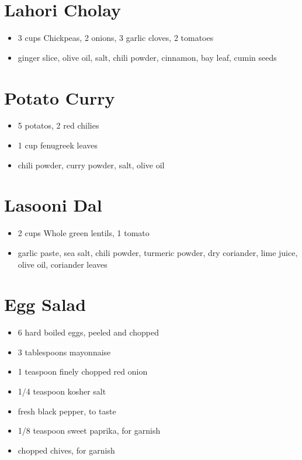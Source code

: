 \documentclass[10pt]{extarticle}
\begin{document}
		\section{Lahori Cholay}
		\begin{itemize}
			\item 3 cups Chickpeas, 2 onions, 3 garlic cloves, 2 tomatoes
			\item ginger slice, olive oil, salt, chili powder, cinnamon, bay leaf, cumin seeds
		\end{itemize}
		\section{Potato Curry}
		\begin{itemize}
			\item 5 potatos, 2 red chilies
			\item 1 cup fenugreek leaves
			\item chili powder, curry powder, salt, olive oil
		\end{itemize}
		\section{Lasooni Dal}
		\begin{itemize}
			\item 2 cups Whole green lentils, 1 tomato
			\item garlic paste, sea salt, chili powder, turmeric powder, dry coriander, lime juice, olive oil, coriander leaves
		\end{itemize}
		\section{Egg Salad} 
		\begin{itemize}
			\item 6 hard boiled eggs, peeled and chopped
			\item 3 tablespoons mayonnaise
			\item 1 teaspoon finely chopped red onion
			\item 1/4 teaspoon kosher salt
			\item fresh black pepper, to taste
			\item 1/8 teaspoon sweet paprika, for garnish
			\item chopped chives, for garnish
		\end{itemize}

		
		
		
		
\end{document}
